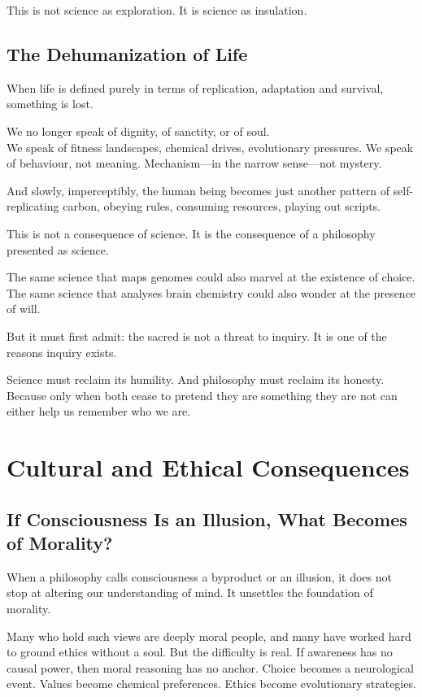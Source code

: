 \documentclass[11pt,a4paper]{article}
\begin{document}
This is not science as exploration. It is science as insulation.

\subsection{The Dehumanization of Life}

When life is defined purely in terms of replication, adaptation and survival, something is lost.

We no longer speak of dignity, of sanctity, or of soul.\\
We speak of fitness landscapes, chemical drives, evolutionary pressures. We speak of behaviour, not meaning. Mechanism---in the narrow sense---not mystery.

And slowly, imperceptibly, the human being becomes just another pattern of self-replicating carbon, obeying rules, consuming resources, playing out scripts.

This is not a consequence of science. It is the consequence of a philosophy presented as science.

The same science that maps genomes could also marvel at the existence of choice.\\
The same science that analyses brain chemistry could also wonder at the presence of will.

But it must first admit: the sacred is not a threat to inquiry. It is one of the reasons inquiry exists.

Science must reclaim its humility. And philosophy must reclaim its honesty. Because only when both cease to pretend they are something they are not can either help us remember who we are.

\section{Cultural and Ethical Consequences}

\subsection{If Consciousness Is an Illusion, What Becomes of Morality?}

When a philosophy calls consciousness a byproduct or an illusion, it does not stop at altering our understanding of mind. It unsettles the foundation of morality.

Many who hold such views are deeply moral people, and many have worked hard to ground ethics without a soul. But the difficulty is real. If awareness has no causal power, then moral reasoning has no anchor. Choice becomes a neurological event. Values become chemical preferences. Ethics become evolutionary strategies.
\end{document}
